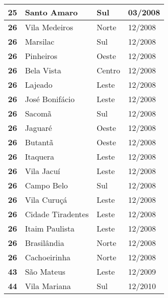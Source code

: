 \begin{table}[H]
\begin{tabular}{l|l|l|l}
\textbf{25} & Santo Amaro & Sul & 03/2008\\ \hline
\textbf{26} & Vila Medeiros & Norte & 12/2008\\ \hline
\textbf{26} & Marsilac & Sul & 12/2008\\ \hline
\textbf{26} & Pinheiros & Oeste & 12/2008\\ \hline
\textbf{26} & Bela Vista & Centro & 12/2008\\ \hline
\textbf{26} & Lajeado & Leste & 12/2008\\ \hline
\textbf{26} & José Bonifácio & Leste & 12/2008\\ \hline
\textbf{26} & Sacomã & Sul & 12/2008\\ \hline
\textbf{26} & Jaguaré & Oeste & 12/2008\\ \hline
\textbf{26} & Butantã & Oeste & 12/2008\\ \hline
\textbf{26} & Itaquera & Leste & 12/2008\\ \hline
\textbf{26} & Vila Jacuí & Leste & 12/2008\\ \hline
\textbf{26} & Campo Belo & Sul & 12/2008\\ \hline
\textbf{26} & Vila Curuçá & Leste & 12/2008\\ \hline
\textbf{26} & Cidade Tiradentes & Leste & 12/2008\\ \hline
\textbf{26} & Itaim Paulista & Leste & 12/2008\\ \hline
\textbf{26} & Brasilândia & Norte & 12/2008\\ \hline
\textbf{26} & Cachoeirinha & Norte & 12/2008\\ \hline
\textbf{43} & São Mateus & Leste & 12/2009\\ \hline
\textbf{44} & Vila Mariana & Sul & 12/2010\\ 
\end{tabular}
\end{table}


